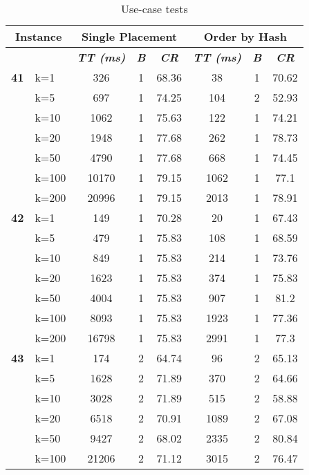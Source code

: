     \begin{table}[htbp]
    \caption{Use-case tests}
    \begin{tabular}{|l|l|c|c|c|c|c|c|}
    
    \multicolumn{ 2}{|c|}{\textbf{Instance}} & \multicolumn{ 3}{c|}{\textbf{Single Placement}} & \multicolumn{ 3}{c|}{\textbf{Order by Hash}} \\ \hline
    \multicolumn{ 2}{|l|}{} & \textbf{\textit{TT (ms)}} & \textbf{\textit{B}} & \textbf{\textit{CR}} & \textbf{\textit{TT (ms)}} & \textbf{\textit{B}} & \textbf{\textit{CR}} \\ \hline
    \multicolumn{1}{|r|}{\textbf{41}} & k=1 & 326 & 1 & 68.36 & 38 & 1 & 70.62 \\ 
     & k=5 & 697 & 1 & 74.25 & 104 & 2 & 52.93 \\ 
     & k=10 & 1062 & 1 & 75.63 & 122 & 1 & 74.21 \\ 
     & k=20 & 1948 & 1 & 77.68 & 262 & 1 & 78.73 \\ 
     & k=50 & 4790 & 1 & 77.68 & 668 & 1 & 74.45 \\ 
     & k=100 & 10170 & 1 & 79.15 & 1062 & 1 & 77.1 \\ 
     & k=200 & 20996 & 1 & 79.15 & 2013 & 1 & 78.91 \\ \hline
    \multicolumn{1}{|r|}{\textbf{42}} & k=1 & 149 & 1 & 70.28 & 20 & 1 & 67.43 \\ 
     & k=5 & 479 & 1 & 75.83 & 108 & 1 & 68.59 \\ 
     & k=10 & 849 & 1 & 75.83 & 214 & 1 & 73.76 \\ 
     & k=20 & 1623 & 1 & 75.83 & 374 & 1 & 75.83 \\ 
     & k=50 & 4004 & 1 & 75.83 & 907 & 1 & 81.2 \\ 
     & k=100 & 8093 & 1 & 75.83 & 1923 & 1 & 77.36 \\ 
     & k=200 & 16798 & 1 & 75.83 & 2991 & 1 & 77.3 \\ \hline
    \multicolumn{1}{|r|}{\textbf{43}} & k=1 & 174 & 2 & 64.74 & 96 & 2 & 65.13 \\ 
     & k=5 & 1628 & 2 & 71.89 & 370 & 2 & 64.66 \\ 
     & k=10 & 3028 & 2 & 71.89 & 515 & 2 & 58.88 \\ 
     & k=20 & 6518 & 2 & 70.91 & 1089 & 2 & 67.08 \\ 
     & k=50 & 9427 & 2 & 68.02 & 2335 & 2 & 80.84 \\ 
     & k=100 & 21206 & 2 & 71.12 & 3015 & 2 & 76.47 \\ 

\end{tabular}
\end{table}

